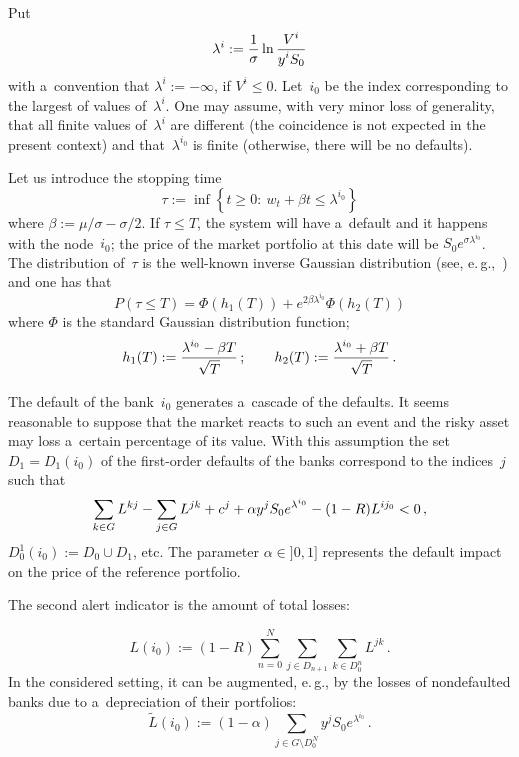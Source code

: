 \begin{multicols}{2}
\smallskip 

Put 
$$
\lambda ^i:=\displaystyle\frac{\displaystyle 1\mathstrut}{\displaystyle \sigma\mathstrut}\ln \displaystyle\frac{\displaystyle V^i\mathstrut}{\displaystyle y^iS_0\mathstrut}
$$
with a~convention that $\lambda ^i:=-\infty$, if $V^i\le 0$. 
Let~$i_0$ be the index corresponding to the largest of values of~$\lambda^i$.  
One may assume, with very minor loss of generality, that all  finite values 
of~$\lambda^i$ are different (the coincidence is not expected in the present 
context) and that~$\lambda^{i_0}$ is finite (otherwise, there will be no defaults). 

Let us introduce the stopping time  
$$
\tau:=\inf \left\{t\ge 0:\ w_t+\beta t\le \lambda ^{i_0} \right\}
$$
where $\beta :=\mu/\sigma-\sigma /2$. 
If  $\tau\le T$, the system will have a~default and it happens with the 
node~$i_0$; the price of the market portfolio at this date will 
be $S_0e^{\sigma\lambda ^{i_0} }$. 
The distribution of~$\tau$ is the well-known inverse Gaussian distribution (see, 
e.\,g.,~\cite{Bor-Sal}) and one has that 
$$
P(\tau\le T)=\Phi(h_1(T))+e^{2\beta \lambda ^{i_0}}\Phi(h_2(T))
$$
where $\Phi$ is the standard Gaussian distribution function; 
$$
h_1(T):= \displaystyle\frac{\displaystyle \lambda ^{i_0}- \beta T\mathstrut}{\displaystyle \sqrt{T}\mathstrut}\,; \qquad h_2(T):= \displaystyle\frac{\displaystyle \lambda 
^{i_0}+\beta T\mathstrut}{\displaystyle \sqrt{T}\mathstrut}\,. 
$$

The default of the bank~$i_0$ generates a~cascade of the defaults. 
It seems reasonable to suppose that the market reacts to such an event and the 
risky asset may loss a~certain percentage of its value.
With this assumption the set $D_1=D_1(i_0)$ of the first-order defaults of the banks 
correspond to the indices~$j$
such that 
\begin{equation*}
\sum\limits_{k\in G}L^{kj}-\sum\limits_{j\in G} L^{jk}+  c^j+\alpha y^jS_0e^{\lambda ^{i_0} } \\
{}- (1- R)L^{ij_0}<0\,,   
\end{equation*}  
$D_0^1(i_0):=D_0\cup D_1$, etc. The parameter $\alpha \in ]0,1]$ represents the 
default impact on the price of the reference portfolio. 

The second alert indicator is the amount of total losses: 

\vspace*{-2pt}

\noindent
$$
L(i_0):=(1-R)\sum\limits_{n=0}^N\sum\limits_{j\in D_{n+1}}\sum\limits_{k\in D_0^n}L^{jk}\,. 
$$ 
In the considered setting, it can be augmented, e.\,g., 
by the losses of nondefaulted banks due to a~depreciation of their portfolios: 
$$
\tilde L(i_0):=(1-\alpha)\sum\limits_{j\in G\setminus D_0^N}y^jS_0e^{\lambda ^{i_0} }\,.  
$$ 


\end{multicols}
